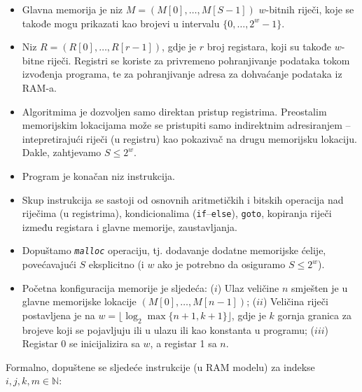 \begin{itemize}
	\item Glavna memorija je niz $M = (M[0], \ldots, M[S-1])$  $w$-bitnih riječi, koje se takođe mogu prikazati kao brojevi u intervalu
 $\{0,\ldots , 2^w - 1\}$.
 	\item Niz $R = (R[0], \ldots , R[r - 1])$,  gdje je $r$ broj registara, koji su takođe $w$-bitne riječi. Registri se koriste za privremeno pohranjivanje podataka tokom izvođenja programa, te za pohranjivanje adresa za dohvaćanje podataka iz RAM-a.  %
 	
 	\item Algoritmima je dozvoljen samo direktan pristup registrima. Preostalim memorijskim lokacijama može se pristupiti samo
 	indirektnim adresiranjem -- intepretirajući riječi (u registru) kao pokazivač na drugu memorijsku lokaciju. Dakle, zahtjevamo
 	$S \leq  2^w$.
 	\item Program je konačan niz instrukcija.
 	\item Skup instrukcija se sastoji od osnovnih aritmetičkih i bitskih operacija nad riječima (u registrima), kondicionalima
 	(\texttt{if}--\texttt{else}), \texttt{goto}, kopiranja riječi između registara i glavne memorije, zaustavljanja.
 	\item Dopuštamo \texttt{\textit{malloc}} operaciju, tj. dodavanje dodatne memorijske ćelije, povećavajući $S$ eksplicitno (i $w$ ako je potrebno da osiguramo $S \leq 2^w$).
 	\item Početna konfiguracija memorije je sljedeća:
 	($i$) Ulaz veličine $n$ smješten je u glavne memorijske lokacije $(M[0],\ldots , M[n - 1])$; ($ii$) Veličina riječi postavljena je na $w = \lfloor \log_2 \max\{n + 1, k + 1\} \rfloor $, gdje je $k$ gornja granica za brojeve koji se
 	pojavljuju ili u ulazu ili kao konstanta u programu; ($iii$) Registar 0 se inicijalizira sa $w$, a registar 1 sa $n$.
 \end{itemize}

Formalno, dopuštene se sljedeće instrukcije (u RAM modelu) za indekse $i, j, k, m \in \mathbb{N} $:

%

